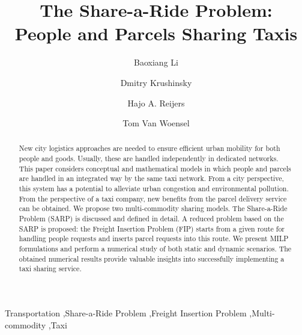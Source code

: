 \documentclass[preprint,authoryear,12pt]{elsarticle}
\begin{document}
\nocite{*}
\begin{frontmatter}
\title{The Share-a-Ride Problem:\\People and Parcels Sharing Taxis}
\author[label1]{Baoxiang Li }
\author[label1]{Dmitry Krushinsky}
\author[label2,label3]{Hajo A. Reijers}
\author[label1]{Tom Van Woensel}



\address[label1]{Department of Industrial Engineering and Innovation Sciences, Eindhoven University of Technology, Eindhoven, The Netherlands}
\address[label2]{Department of Mathematics and Computer Science, Eindhoven University of Technology, Eindhoven, The Netherlands}
\address[label3]{Perceptive Software, Apeldoorn, The Netherlands}

\begin{abstract}
New city logistics approaches are needed to ensure efficient urban mobility for both people and goods. Usually, these are handled independently in dedicated networks. This paper considers conceptual and mathematical models in which people and parcels are handled in an integrated way by the same taxi network. From a city perspective, this system has a potential to alleviate urban congestion and environmental pollution. From the perspective of a taxi company, new benefits from the parcel delivery service can be obtained. We propose two multi-commodity sharing models. The Share-a-Ride Problem (SARP) is discussed and defined in detail. A reduced problem based on the SARP is proposed: the Freight Insertion Problem (FIP) starts from a given route for handling people requests and inserts parcel requests into this route. We present MILP formulations and perform a numerical study of both static and dynamic scenarios. The obtained numerical results provide valuable insights into successfully implementing a taxi sharing service.
\end{abstract}

\begin{keyword}
Transportation \sep Share-a-Ride Problem  \sep Freight Insertion Problem \sep Multi-commodity \sep Taxi
\end{keyword}
\end{frontmatter}
\end{document}
